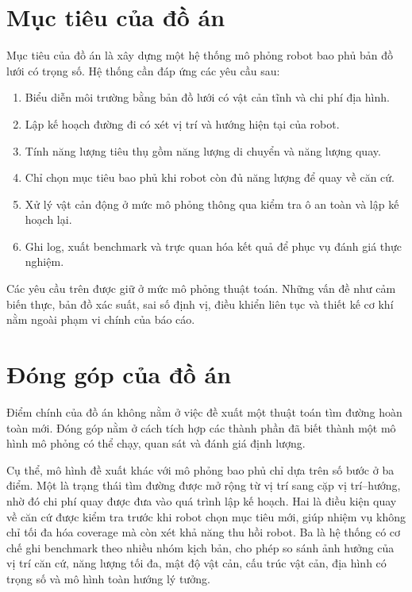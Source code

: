 \documentclass[../DoAn.tex]{subfiles}
\begin{document}
\section{Mục tiêu của đồ án}

Mục tiêu của đồ án là xây dựng một hệ thống mô phỏng robot bao phủ bản đồ lưới có trọng số. Hệ thống cần đáp ứng các yêu cầu sau:

\begin{enumerate}
\item Biểu diễn môi trường bằng bản đồ lưới có vật cản tĩnh và chi phí địa hình.
\item Lập kế hoạch đường đi có xét vị trí và hướng hiện tại của robot.
\item Tính năng lượng tiêu thụ gồm năng lượng di chuyển và năng lượng quay.
\item Chỉ chọn mục tiêu bao phủ khi robot còn đủ năng lượng để quay về căn cứ.
\item Xử lý vật cản động ở mức mô phỏng thông qua kiểm tra ô an toàn và lập kế hoạch lại.
\item Ghi log, xuất benchmark và trực quan hóa kết quả để phục vụ đánh giá thực nghiệm.
\end{enumerate}

Các yêu cầu trên được giữ ở mức mô phỏng thuật toán. Những vấn đề như cảm biến thực, bản đồ xác suất, sai số định vị, điều khiển liên tục và thiết kế cơ khí nằm ngoài phạm vi chính của báo cáo.

\section{Đóng góp của đồ án}

Điểm chính của đồ án không nằm ở việc đề xuất một thuật toán tìm đường hoàn toàn mới. Đóng góp nằm ở cách tích hợp các thành phần đã biết thành một mô hình mô phỏng có thể chạy, quan sát và đánh giá định lượng.

Cụ thể, mô hình đề xuất khác với mô phỏng bao phủ chỉ dựa trên số bước ở ba điểm. Một là trạng thái tìm đường được mở rộng từ vị trí sang cặp vị trí--hướng, nhờ đó chi phí quay được đưa vào quá trình lập kế hoạch. Hai là điều kiện quay về căn cứ được kiểm tra trước khi robot chọn mục tiêu mới, giúp nhiệm vụ không chỉ tối đa hóa coverage mà còn xét khả năng thu hồi robot. Ba là hệ thống có cơ chế ghi benchmark theo nhiều nhóm kịch bản, cho phép so sánh ảnh hưởng của vị trí căn cứ, năng lượng tối đa, mật độ vật cản, cấu trúc vật cản, địa hình có trọng số và mô hình toàn hướng lý tưởng.
\end{document}

